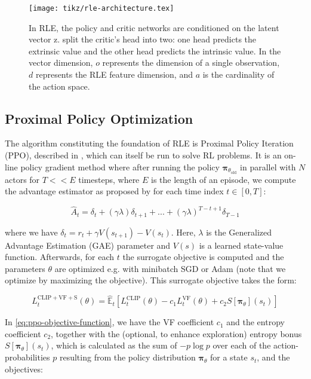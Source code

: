 \documentclass[10pt]{article} %
\begin{document}
\begin{figure}
  \centering
  \texttt{[image: tikz/rle-architecture.tex]}
  \caption{In RLE, the policy and critic networks are conditioned on the latent vector z. \cite{rle-paper} split the critic's head into two: one head predicts the extrinsic value and the other head predicts the intrinsic value. In the vector dimension, $o$ represents the dimension of a single observation, $d$ represents the RLE feature dimension, and $a$ is the cardinality of the action space.}
  \label{fig:rle-architecture}
\end{figure}

\subsection{Proximal Policy Optimization}

\noindent The algorithm constituting the foundation of RLE is Proximal Policy Iteration (PPO), described in \cite{ppo-paper}, which can itself be run to solve RL problems. It is an on-line policy gradient method where after running the policy $\boldsymbol{\pi}_{\theta_{\text{old}}}$ in parallel with $N$ actors for $T << E$ timesteps, where $E$ is the length of an episode, we compute the advantage estimator as proposed by \cite{generalized-advantage-estimation-paper} for each time index $t \in [0, T]$:

\begin{equation}
  \hat{A}_{t} = \delta_{t} + \left(\gamma \lambda\right) \delta_{t+1} + ... + \left(\gamma \lambda\right)^{T-t+1} \delta_{T - 1}
  \label{eq:ppo-advantage-estimator}
\end{equation}

\noindent where we have $\delta_{t} = r_{t} + \gamma V(s_{t+1}) - V(s_{t})$. Here, $\lambda$ is the Generalized Advantage Estimation (GAE) parameter and $V(s)$ is a learned state-value function. Afterwards, for each $t$ the surrogate objective is computed and the parameters $\theta$ are optimized e.g. with minibatch SGD or Adam (note that we optimize by maximizing the objective). This surrogate objective takes the form:

\begin{equation}
  L_{t}^{\text{CLIP} + \text{VF} + \text{S}}(\theta) = \hat{\mathbb{E}}_{t} \left[L_{t}^{\text{CLIP}}(\theta) - c_{1} L_{t}^{\text{VF}}(\theta) + c_{2} S[\boldsymbol{\pi}_{\theta}](s_{t})\right]
  \label{eq:ppo-objective-function}
\end{equation}

\noindent In \eqref{eq:ppo-objective-function}, we have the VF coefficient $c_{1}$ and the entropy coefficient $c_{2}$, together with the (optional, to enhance exploration) entropy bonus $S[\boldsymbol{\pi}_{\theta}](s_{t})$, which is calculated as the sum of $- p \log{p}$ over each of the action-probabilities $p$ resulting from the policy distribution $\boldsymbol{\pi}_{\theta}$ for a state $s_{t}$, and the objectives:
\end{document}
